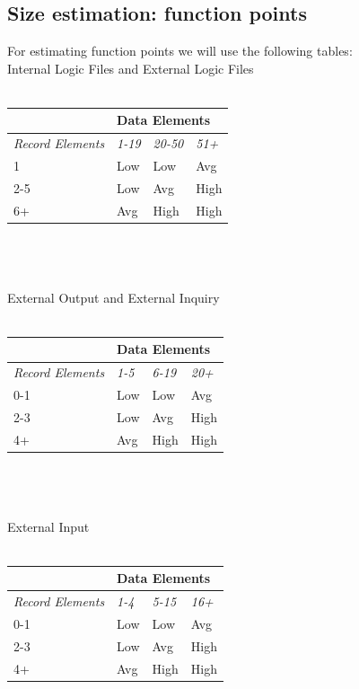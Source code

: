 \documentclass{article}
\begin{document}
\subsection{Size estimation: function points}
For estimating function points we will use the following tables:\\
Internal Logic Files and External Logic Files \\\\
\begin{tabular}{|p{3cm}|p{1cm}|p{1cm}|p{1cm}|}
\hline
& \multicolumn{3}{l|}{Data Elements}\\
\hline
\textit{Record Elements} & \textit{1-19} & \textit{20-50} & \textit{51+} \\
\hline
1 & Low & Low & Avg\\
\hline
2-5 & Low & Avg & High\\
\hline
6+ & Avg & High & High\\
\hline
\end{tabular}
\\\\\\
External Output and External Inquiry
\\\\
\begin{tabular}{|p{3cm}|p{1cm}|p{1cm}|p{1cm}|}
\hline
& \multicolumn{3}{l|}{Data Elements}\\
\hline
\textit{Record Elements} & \textit{1-5} & \textit{6-19} & \textit{20+} \\
\hline
0-1 & Low & Low & Avg\\
\hline
2-3 & Low & Avg & High\\
\hline
4+ & Avg & High & High\\
\hline
\end{tabular}
\\\\\\
External Input
\\\\
\begin{tabular}{|p{3cm}|p{1cm}|p{1cm}|p{1cm}|}
\hline
& \multicolumn{3}{l|}{Data Elements}\\
\hline
\textit{Record Elements} & \textit{1-4} & \textit{5-15} & \textit{16+} \\
\hline
0-1 & Low & Low & Avg\\
\hline
2-3 & Low & Avg & High\\
\hline
4+ & Avg & High & High\\
\hline
\end{tabular}
\end{document}
